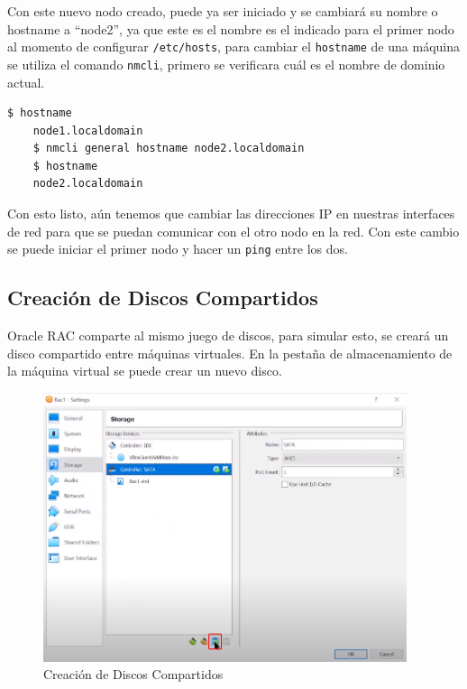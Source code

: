 \documentclass{article}
\begin{document}
Con este nuevo nodo creado, puede ya ser iniciado y se cambiará su nombre o hostname a ``node2'', ya que este es el nombre es el indicado para el primer nodo al momento de configurar \texttt{/etc/hosts}, para cambiar el \texttt{hostname} de una máquina se utiliza el comando \texttt{nmcli}, primero se verificara cuál es el nombre de dominio actual.

\begin{lstlisting}[style=mystyle,language=bash]
	$ hostname
	node1.localdomain
	$ nmcli general hostname node2.localdomain
	$ hostname
	node2.localdomain
\end{lstlisting}

Con esto listo, aún tenemos que cambiar las direcciones IP en nuestras interfaces de red para que se puedan comunicar con el otro nodo en la red. Con este cambio se puede iniciar el primer nodo y hacer un \texttt{ping} entre los dos.

\subsection{Creación de Discos Compartidos}

Oracle RAC comparte al mismo juego de discos, para simular esto, se creará un disco compartido entre máquinas virtuales. En la pestaña de almacenamiento de la máquina virtual se puede crear un nuevo disco.

\begin{figure}[H]
		\begin{center}
			\includegraphics[width=0.95\textwidth]{vm_shared_disk_creation.png}
		\end{center}
		\caption{Creación de Discos Compartidos}
\end{figure}
\end{document}
